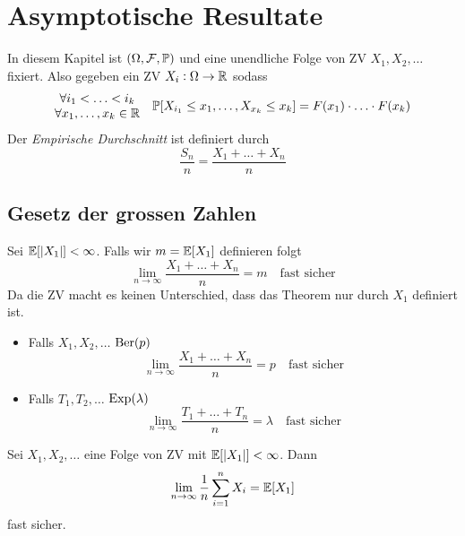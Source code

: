 \section{Asymptotische Resultate}%
\label{sec:asymptotische_resultate}

In diesem Kapitel ist $(\Omega, \mathcal{F} , \mathbb{P})$ und eine unendliche Folge von \iid ZV $X_1, X_2, \ldots$ fixiert.
Also gegeben ein ZV $X_i : \Omega \rightarrow \mathbb{R}$ sodass
\begin{equation*}
	\begin{matrix}
		\forall i_1 < \ldots < i_k\\
		\forall x_1 , \ldots , x_k \in \mathbb{R}
	\end{matrix}
	\quad \mathbb{P} [X_{i_1} \leq x_1, \ldots , X_{x_k} \leq x_k] = F(x_1) \cdot \ldots \cdot F(x_k)
\end{equation*}
Der \emph{Empirische Durchschnitt} ist definiert durch
\begin{equation*}
	\frac{S_n}{n} = \frac{X_1 + \ldots + X_n}{n} 
\end{equation*}


\subsection{Gesetz der grossen Zahlen}%
\label{sub:gesetz_der_grossen_zahlen}

\begin{tcolorbox}[lemmacore]
	Sei $\mathbb{E} [|X_1|] < \infty$. Falls wir $m = \mathbb{E} [X_1]$ definieren folgt
	\begin{equation*}
		\lim_{n \rightarrow \infty} \frac{X_1 + \ldots  + X_n}{n} = m \quad\text{fast sicher}
	\end{equation*}
	Da die ZV \iid macht es keinen Unterschied, dass das Theorem nur durch $X_1$ definiert ist.
\end{tcolorbox}
\begin{itemize}
	\item Falls $X_1 , X_2, \ldots$ \iid $\text{Ber} (p)$ 
		\begin{equation*}
			\lim_{n \rightarrow \infty} \frac{X_1 + \ldots  + X_n}{n} = p \quad\text{fast sicher}
		\end{equation*}
	\item Falls $T_1 , T_2, \ldots$ \iid $\text{Exp} (\lambda)$ 
		\begin{equation*}
			\lim_{n \rightarrow \infty} \frac{T_1 + \ldots  + T_n}{n} = \lambda \quad\text{fast sicher}
		\end{equation*}
\end{itemize}
\begin{tcolorbox}[lemmacore]
	Sei $X_1 , X_2 , \ldots$ eine Folge von \iid ZV mit $\mathbb{E}[|X_1|] < \infty$. Dann
	\begin{equation*}
		\lim_{n \rightarrow \infty} \frac{1}{n} \sum_{i=1}^{n} X_i = \mathbb{E}[X_1]
	\end{equation*}
	fast sicher.
\end{tcolorbox}


